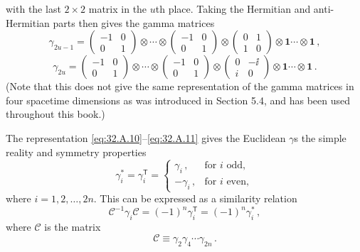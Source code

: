 with the last \(2\times2\) matrix in the \(u\)th place. Taking the Hermitian
and anti-Hermitian parts then gives the gamma matrices
\begin{equation}
  \gamma_{2u-1}=
  \begin{pmatrix}
    -1&0\\
    0&1
  \end{pmatrix}
  \otimes\cdots\otimes
  \begin{pmatrix}
    -1&0\\
    0&1
  \end{pmatrix}
  \otimes
  \begin{pmatrix}
    0&1\\
    1&0
  \end{pmatrix}
  \otimes\mathbf{1}\cdots\otimes\mathbf{1}\,,
  \tag{32.A.10}\label{eq:32.A.10}
\end{equation}
\begin{equation}
  \gamma_{2u}=
  \begin{pmatrix}
    -1&0\\
    0&1
  \end{pmatrix}
  \otimes\cdots\otimes
  \begin{pmatrix}
    -1&0\\
    0&1
  \end{pmatrix}
  \otimes
  \begin{pmatrix}
    0&-\ii\\
    i&0
  \end{pmatrix}
  \otimes\mathbf{1}\cdots\otimes\mathbf{1}\,.
  \tag{32.A.11}\label{eq:32.A.11}
\end{equation}
(Note that this does not give the same representation of the gamma matrices
in four spacetime dimensions as was introduced in Section 5.4, and has been
used throughout this book.)

The representation \eqref{eq:32.A.10}--\eqref{eq:32.A.11} gives the
Euclidean \(\gamma\)s the simple reality and symmetry properties
\begin{equation}
  \gamma_i^*=\gamma_i^{\mathsf T}
  =
  \begin{cases}
    \gamma_i\,,&\text{for \(i\) odd},\\
    -\gamma_i\,,&\text{for \(i\) even},
  \end{cases}
  \tag{32.A.12}\label{eq:32.A.12}
\end{equation}
where \(i=1,2,\ldots,2n\). This can be expressed as a similarity relation
\begin{equation}
  \mathcal C^{-1}\gamma_i\mathcal C
  =(-1)^n\gamma_i^{\mathsf T}
  =(-1)^n\gamma_i^*\,,
  \tag{32.A.13}\label{eq:32.A.13}
\end{equation}
where \(\mathcal C\) is the matrix
\begin{equation}
  \mathcal C\equiv\gamma_2\gamma_4\cdots\gamma_{2n}\,.
  \tag{32.A.14}\label{eq:32.A.14}
\end{equation}

